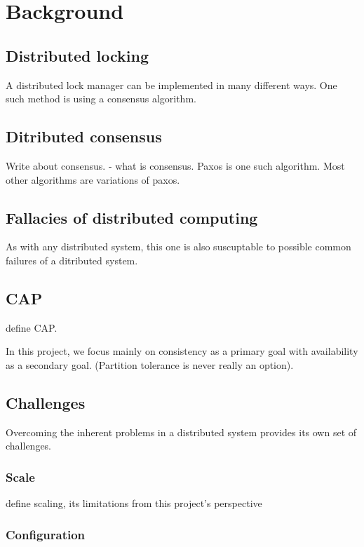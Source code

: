 \chapter{Background}
\label{chapter:background}

\section{Distributed locking}

A distributed lock manager can be implemented in many different ways. One such
method is using a consensus algorithm.

\section{Ditributed consensus}

Write about consensus. - what is consensus.
Paxos is one such algorithm. Most other algorithms are variations of paxos.

\section{Fallacies of distributed computing}

As with any distributed system, this one is also suscuptable to possible common
failures of a ditributed system.

\section{CAP}

{define CAP.}

In this project, we focus mainly on consistency as a primary goal with 
availability as a secondary goal. (Partition tolerance is never really an
option).

\section{Challenges}

Overcoming the inherent problems in a distributed system provides its own set of
challenges.

\subsection{Scale}

{define scaling, its limitations from this project's perspective}

\subsection{Configuration}

